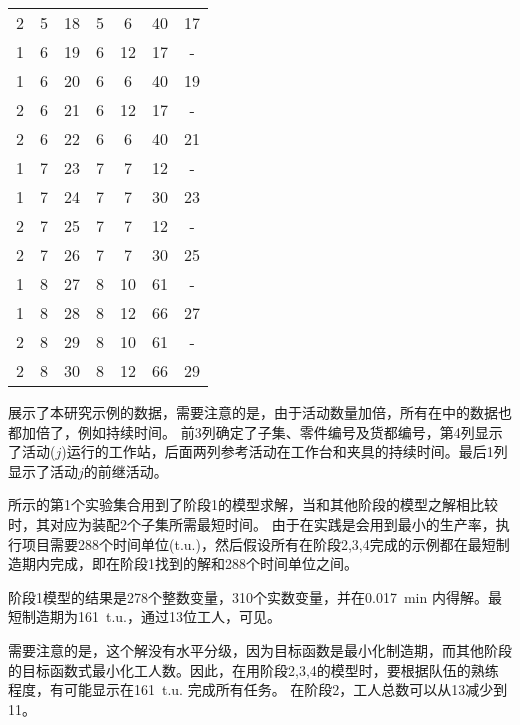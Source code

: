 \begin{table}[h]
\begin{tabular}{ccccccc}
    2     & 5     & 18    & 5     & 6     & 40    & 17 \\
    1     & 6     & 19    & 6     & 12    & 17    & - \\
    1     & 6     & 20    & 6     & 6     & 40    & 19 \\
    2     & 6     & 21    & 6     & 12    & 17    & - \\
    2     & 6     & 22    & 6     & 6     & 40    & 21 \\
    1     & 7     & 23    & 7     & 7     & 12    & - \\
    1     & 7     & 24    & 7     & 7     & 30    & 23 \\
    2     & 7     & 25    & 7     & 7     & 12    & - \\
    2     & 7     & 26    & 7     & 7     & 30    & 25 \\
    1     & 8     & 27    & 8     & 10    & 61    & - \\
    1     & 8     & 28    & 8     & 12    & 66    & 27 \\
    2     & 8     & 29    & 8     & 10    & 61    & - \\
    2     & 8     & 30    & 8     & 12    & 66    & 29 \\
    \bottomrule
    \end{tabular}
  \label{tab:inputdatainstance}
  \end{table}

展示了本研究示例的数据，需要注意的是，由于活动数量加倍，所有在中的数据也都加倍了，例如持续时间。
前3列确定了子集、零件编号及货都编号，第4列显示了活动($j$)运行的工作站，后面两列参考活动在工作台和夹具的持续时间。最后1列显示了活动$j$的前继活动。

所示的第1个实验集合用到了阶段1的模型求解，当和其他阶段的模型之解相比较时，其对应为装配2个子集所需最短时间。
由于在实践是会用到最小的生产率，执行项目需要288个时间单位(t.u.)，然后假设所有在阶段2,3,4完成的示例都在最短制造期内完成，即在阶段1找到的解和288个时间单位之间。

阶段1模型的结果是278个整数变量，310个实数变量，并在0.017\ min 内得解。最短制造期为161\ t.u.，通过13位工人，可见。
\begin{figure}[h]
\begin{floatrow}[2]
\centering
{}
\end{floatrow}
\end{figure}
需要注意的是，这个解没有水平分级，因为目标函数是最小化制造期，而其他阶段的目标函数式最小化工人数。因此，在用阶段2,3,4的模型时，要根据队伍的熟练程度，有可能显示在161\ t.u. 完成所有任务。
在阶段2，工人总数可以从13减少到11。

